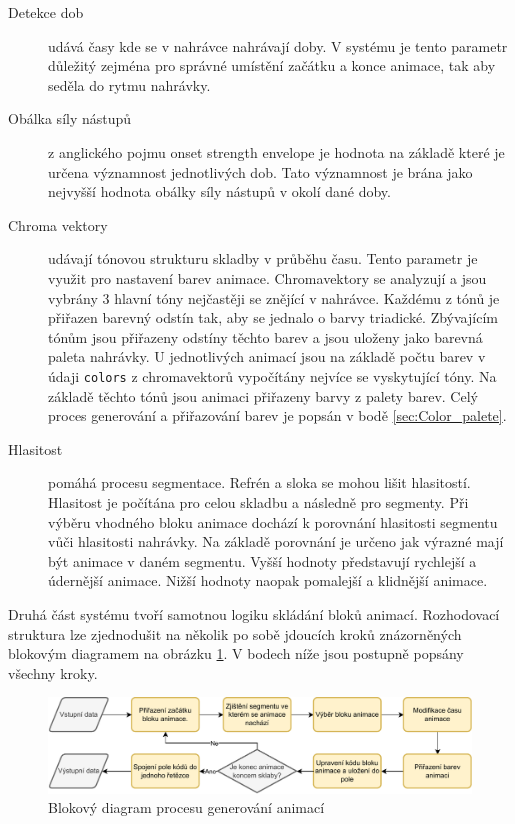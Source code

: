 \begin{description}
    \item[Detekce dob] udává časy kde se v nahrávce nahrávají doby. V systému je tento parametr důležitý zejména pro správné umístění začátku a konce animace, tak aby seděla do rytmu nahrávky. 

    \item[Obálka síly nástupů] z anglického pojmu onset strength envelope je hodnota na základě které je určena významnost jednotlivých dob. Tato významnost je brána jako nejvyšší hodnota obálky síly nástupů v okolí dané doby.
     
    \item[Chroma vektory] udávají tónovou strukturu skladby v průběhu času. Tento parametr je využit pro nastavení barev animace. Chromavektory se analyzují a jsou vybrány 3 hlavní tóny nejčastěji se znějící v nahrávce. Každému z tónů je přiřazen barevný odstín tak, aby se jednalo o barvy triadické. Zbývajícím tónům jsou přiřazeny odstíny těchto barev a jsou uloženy jako barevná paleta nahrávky. U jednotlivých animací jsou na základě počtu barev v údaji \texttt{colors} z chromavektorů vypočítány nejvíce se vyskytující tóny. Na základě těchto tónů jsou animaci přiřazeny barvy z palety barev. Celý proces generování a přiřazování barev je popsán v bodě \ref{sec:Color_palete}.

    \item[Hlasitost] pomáhá procesu segmentace. Refrén a sloka se mohou lišit hlasitostí. Hlasitost je počítána pro celou skladbu a následně pro segmenty. Při výběru vhodného bloku animace dochází k porovnání hlasitosti segmentu vůči hlasitosti nahrávky. Na základě porovnání je určeno jak výrazné mají být animace v daném segmentu. Vyšší hodnoty představují rychlejší a údernější animace. Nižší hodnoty naopak pomalejší a klidnější animace.
\end{description}


Druhá část systému tvoří samotnou logiku skládání bloků animací. Rozhodovací struktura lze zjednodušit na několik po sobě jdoucích kroků znázorněných blokovým diagramem na obrázku \ref{fig:diagram_procesu_generovani_animaci}. V bodech níže jsou postupně popsány všechny kroky.

\begin{figure}[H]
    \centering
    \includegraphics[width = 1\linewidth]{obrazky/UML_diagramy_anim_generation_process.pdf}
    \caption{Blokový diagram procesu generování animací}
    \label{fig:diagram_procesu_generovani_animaci}
\end{figure}

